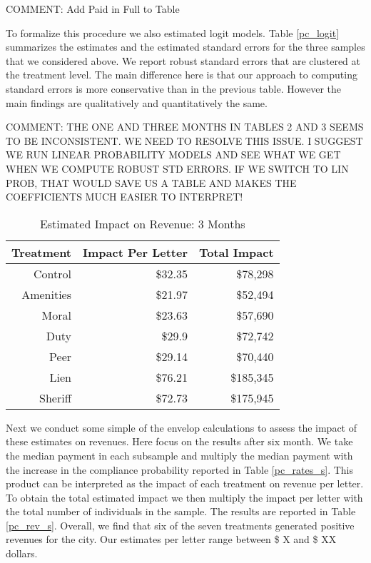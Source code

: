 \documentclass[12pt]{article}
\begin{document}
COMMENT: Add Paid in Full to Table


To formalize this procedure we also estimated logit models. Table 
\ref{pc_logit} summarizes the estimates and the estimated
standard errors for the three samples that we considered above. We
report robust standard errors that are clustered at the treatment level. The main difference
here is that our approach to computing standard errors  is more conservative than in the previous table.
However the main findings are qualitatively and quantitatively the same.

\noindent COMMENT: THE ONE AND THREE MONTHS IN TABLES 2 AND 3 SEEMS TO BE INCONSISTENT. WE NEED TO RESOLVE THIS ISSUE. I SUGGEST WE RUN LINEAR PROBABILITY MODELS AND SEE WHAT WE GET WHEN WE COMPUTE ROBUST STD ERRORS. IF WE SWITCH TO LIN PROB, THAT WOULD SAVE US A TABLE AND MAKES THE COEFFICIENTS MUCH EASIER TO INTERPRET!


\begin{table}[ht]
\centering
\caption{Estimated Impact on Revenue: 3 Months} 
\label{rev_ep}
\begin{tabular}{rrr}
  \hline
Treatment & Impact Per Letter & Total Impact \\ 
  \hline
Control & \$32.35 & \$78,298 \\ 
  Amenities & \$21.97 & \$52,494 \\ 
  Moral & \$23.63 & \$57,690 \\ 
  Duty & \$29.9 & \$72,742 \\ 
  Peer & \$29.14 & \$70,440 \\ 
  Lien & \$76.21 & \$185,345 \\ 
  Sheriff & \$72.73 & \$175,945 \\ 
   \hline
\end{tabular}
\end{table}


Next we conduct some simple of the envelop calculations to assess the impact of these estimates on revenues. Here focus on the results after six month. We take the median payment in each subsample and multiply the median payment with the increase in the compliance probability reported in Table \ref{pc_rates_s}. This product can be interpreted as the impact of each treatment on revenue per letter. To obtain the total estimated impact we then multiply the impact per letter with the total number of individuals in the sample. The results are reported in Table \ref{pc_rev_s}.
Overall, we find that six of the seven treatments generated positive revenues for the city. Our estimates per letter range between \$ X and \$ XX dollars.
\end{document}
